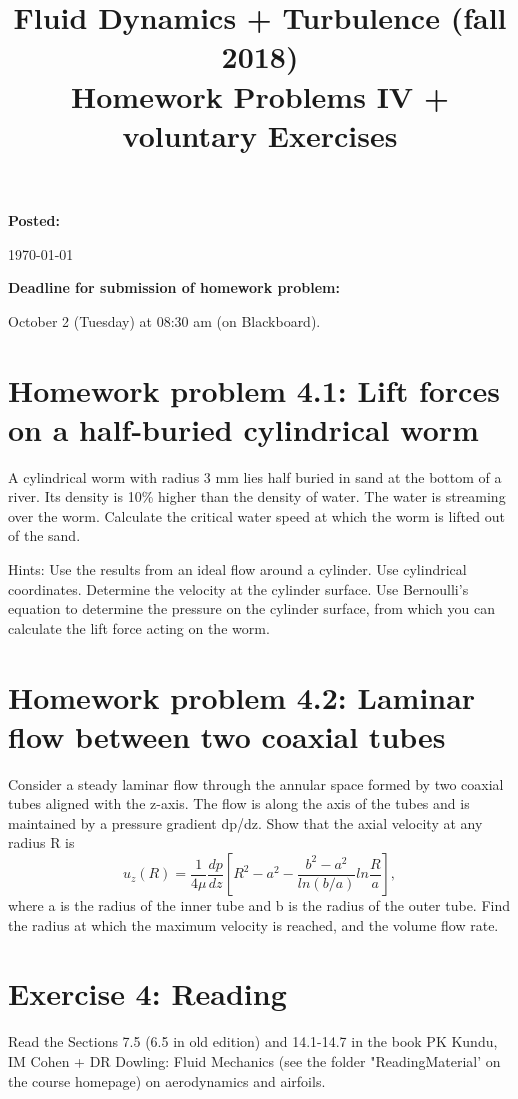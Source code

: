 \documentclass[a4paper, 10pt]{article}
\title{Fluid Dynamics + Turbulence (fall 2018)\\Homework Problems IV + voluntary Exercises}
\author{}
\date{}
\begin{document}
\maketitle

\large{
\textbf{Posted:}

\today

\bigskip
\textbf{Deadline for submission of homework problem:}

October 2 (Tuesday) at 08:30 am (on Blackboard).
}

\bigskip

\section*{Homework problem 4.1: Lift forces on a half-buried cylindrical worm}
A cylindrical worm with radius 3 mm lies half buried in sand at the bottom of a river. Its density is 10\% higher than the density of water. The water is streaming over the worm. Calculate the critical water speed at which the worm is lifted out of the sand.

Hints: Use the results from an ideal flow around a cylinder. Use cylindrical coordinates. Determine the velocity at the cylinder surface. Use Bernoulli’s equation to determine the pressure on the cylinder surface, from which you can calculate the lift force acting on the worm.

\section*{Homework problem 4.2: Laminar flow between two coaxial tubes}
Consider a steady laminar flow through the annular space formed by two coaxial tubes aligned with the z-axis. The flow is along the axis of the tubes and is maintained by a pressure gradient dp/dz. Show that the axial velocity at any radius R is
\begin{equation}
u_z(R) = \frac{1}{4\mu}\frac{dp}{dz}\left[ R^2-a^2-\frac{b^2-a^2}{ln(b/a)}ln\frac{R}{a} \right],
\end{equation}
where a is the radius of the inner tube and b is the radius of the outer tube. Find the radius at which the maximum velocity is reached, and the volume flow rate.

\section{Exercise 4: Reading}
Read the Sections 7.5 (6.5 in old edition) and 14.1-14.7 in the book PK Kundu, IM Cohen + DR Dowling: Fluid Mechanics (see the folder "ReadingMaterial’ on the course homepage) on aerodynamics and airfoils.
\end{document}
